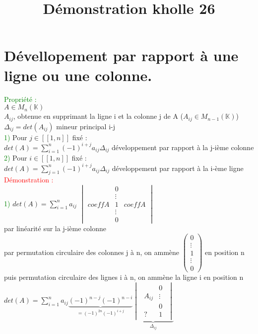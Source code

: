 \documentclass{article}
\begin{document}
\title{Démonstration kholle 26}
\date{}
\maketitle
\renewcommand{\thesection}{\Roman{section}}
\setlength{\parindent}{1.5cm}
\section{Dévellopement par rapport à une ligne ou une colonne.}
\textcolor{green}{Propriété :} \\
$A \in M_n(\mathbb K) $ \\
$A_{ij}$, obtenue en supprimant la ligne i et la colonne j de A ($A_{ij} \in M_{n-1}(\mathbb K)$) \\
$\Delta_{ij}=det(A_{ij})$ mineur principal i-j \\
\textcolor{green}{1)} Pour $j \in [[1,n]]$ fixé : \\
$det(A)=\sum_{i=1}^n (-1)^{i+j} a_{ij} \Delta_{ij}$ développement par rapport à la j-ième colonne \\
\textcolor{green}{2)} Pour $i \in [[1,n]]$ fixé : \\
$det(A)= \sum_{j=1}^n (-1)^{i+j} a_{ij} \Delta_{ij}$ développement par rapport à la i-ème ligne \\
\textcolor{red}{Démonstration :} \\
\textcolor{green}{1)} $det(A)=\sum_{i=1}^n a_{ij}$
$\begin{vmatrix} &0 & \\ & \vdots &\\
  coeffA & 1 & coeffA \\
  & \vdots & \\
  & 0 &
\end{vmatrix}$\\
par linéarité sur la j-ième colonne \\
par permutation circulaire des colonnes j à n, on ammène $\begin{pmatrix} 0 \\ \vdots \\ 1 \\ \vdots \\ 0\end{pmatrix}$ en position n \\
  puis permutation circulaire des lignes i à n, on ammène la ligne i en position n \\
  $det(A)= \sum_{i=1}^n a_{ij} \underbrace{(-1)^{n-j} (-1)^{n-i}}_{=(-1)^{2n}(-1)^{i+j}} \underbrace{\begin{vmatrix} \begin{array}{l|cr}
    & 0 \\
    A_{ij} &  \vdots \\
        & 0\\
    \hline ? & 1
      \end{array} \end{vmatrix} }_{\Delta_{ij}}$ \\
\end{document}

